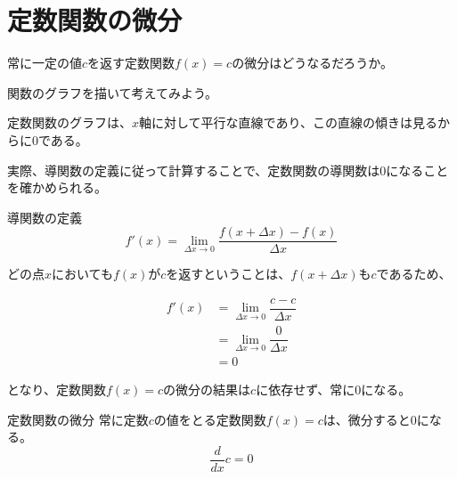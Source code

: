 \documentclass[../../../topic_calculus]{subfiles}
\begin{document}
\sectionline
\section{定数関数の微分}

常に一定の値$c$を返す定数関数$f(x) = c$の微分はどうなるだろうか。

関数のグラフを描いて考えてみよう。

\begin{center}
\end{center}

定数関数のグラフは、$x$軸に対して平行な直線であり、この直線の傾きは見るからに$0$である。

実際、導関数の定義に従って計算することで、定数関数の導関数は$0$になることを確かめられる。

\begin{review}
  導関数の定義
  \begin{equation}
    f'(x) = \lim_{\Delta x \to 0} \frac{f(x + \Delta x) - f(x)}{\Delta x}
  \end{equation}
\end{review}

どの点$x$においても$f(x)$が$c$を返すということは、$f(x+\Delta x)$も$c$であるため、

\begin{align}
  f'(x) & = \lim_{\Delta x \to 0} \dfrac{c - c}{\Delta x} \\
        & = \lim_{\Delta x \to 0} \dfrac{0}{\Delta x}     \\
        & = 0
\end{align}

となり、定数関数$f(x) = c$の微分の結果は$c$に依存せず、常に$0$になる。

\begin{theorem}{定数関数の微分}
  常に定数$c$の値をとる定数関数$f(x) = c$は、微分すると$0$になる。
  \begin{equation}
    \dfrac{d}{dx} c = 0
  \end{equation}
\end{theorem}
\end{document}
